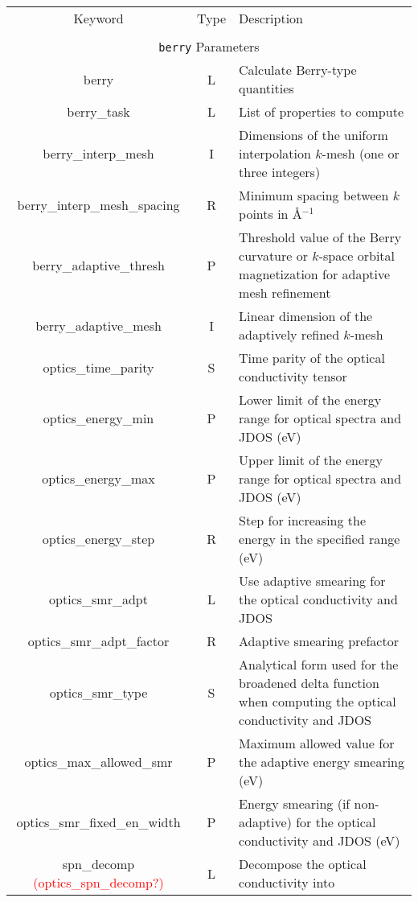 \begin{table}[hH!]
\begin{center}
\begin{tabular}{|c|c|p{6cm}|}
  \hline
  Keyword & Type & Description \\
  &      &             \\
  \hline\hline
  \multicolumn{3}{|c|}{{\tt berry} Parameters} \\
  \hline
  {\sc berry}  & L & Calculate Berry-type quantities \\
  {\sc berry\_task}& L  & List of properties to compute \\
  {\sc berry\_interp\_mesh} & I & Dimensions of the uniform interpolation $k$-mesh 
  (one or three integers)\\ 
  {\sc berry\_interp\_mesh\_spacing}& R & Minimum spacing between $k$ points in 
  \AA$^{-1}$\\
  {\sc berry\_adaptive\_thresh} & P & Threshold value of the Berry curvature or 
  $k$-space orbital magnetization for adaptive mesh refinement\\ 
  {\sc berry\_adaptive\_mesh} & I & Linear dimension of the adaptively refined 
  $k$-mesh\\ 
  {\sc optics\_time\_parity}& S & Time parity of the optical conductivity tensor\\ 
  {\sc optics\_energy\_min} & P & Lower limit of the energy range for
  optical spectra and JDOS (eV) \\
  {\sc optics\_energy\_max}& P & Upper limit of the energy range for
  optical spectra and JDOS (eV) \\
  {\sc optics\_energy\_step}& R &  Step for increasing the energy in the 
  specified range (eV)\\
  {\sc optics\_smr\_adpt} & L & Use adaptive smearing for the 
  optical conductivity and JDOS \\
  {\sc optics\_smr\_adpt\_factor} & R & Adaptive smearing prefactor \\
  {\sc optics\_smr\_type} & S & Analytical form used for the broadened delta function
  when computing the optical conductivity and JDOS\\  
  {\sc optics\_max\_allowed\_smr} & P & Maximum allowed value for the 
  adaptive energy smearing (eV) \\
  {\sc optics\_smr\_fixed\_en\_width} & P  & Energy smearing (if non-adaptive)
  for the optical conductivity and JDOS (eV) \\
  {\sc spn\_decomp} \textcolor{red}{({\sc optics\_spn\_decomp}?)}& L & Decompose the optical conductivity into

\end{tabular}
\end{center}
\end{table}
